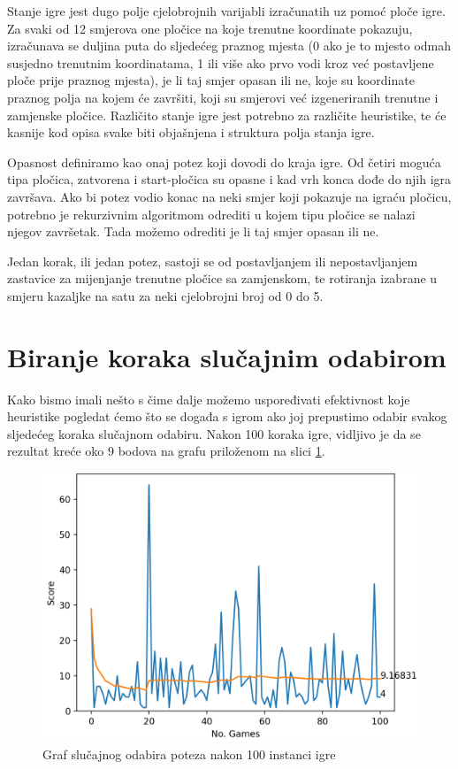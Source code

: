 \documentclass[zavrsnirad]{fer}
\begin{document}
Stanje igre jest dugo polje cjelobrojnih varijabli izračunatih uz pomoć ploče igre. Za svaki od 12 smjerova one pločice na koje trenutne koordinate pokazuju, izračunava se duljina puta do sljedećeg praznog mjesta (0 ako je to mjesto odmah susjedno trenutnim koordinatama, 1 ili više ako prvo vodi kroz već postavljene ploče prije praznog mjesta), je li taj smjer opasan ili ne, koje su koordinate praznog polja na kojem će završiti, koji su smjerovi već izgeneriranih trenutne i zamjenske pločice. Različito stanje igre jest potrebno za različite heuristike, te će kasnije kod opisa svake biti objašnjena i struktura polja stanja igre.

Opasnost definiramo kao onaj potez koji dovodi do kraja igre. Od četiri moguća tipa pločica, zatvorena i start-pločica su opasne i kad vrh konca dođe do njih igra završava. Ako bi potez vodio konac na neki smjer koji pokazuje na igraću pločicu, potrebno je rekurzivnim algoritmom odrediti u kojem tipu pločice se nalazi njegov završetak. Tada možemo odrediti je li taj smjer opasan ili ne.

Jedan korak, ili jedan potez, sastoji se od postavljanjem ili nepostavljanjem zastavice za mijenjanje trenutne pločice sa zamjenskom, te rotiranja izabrane u smjeru kazaljke na satu za neki cjelobrojni broj od 0 do 5.


\section{Biranje koraka slučajnim odabirom}
\label{pog:slucajan_odabir}

Kako bismo imali nešto s čime dalje možemo uspoređivati efektivnost koje heuristike pogledat ćemo što se događa s igrom ako joj prepustimo odabir svakog sljedećeg koraka slučajnom odabiru. Nakon 100 koraka igre, vidljivo je da se rezultat kreće oko 9 bodova na grafu priloženom na slici \ref{slk:random_graph}.


\begin{figure}[htb]
	\centering
	\includegraphics[width=0.68\linewidth]{Figures/random.png} 
	\caption{Graf slučajnog odabira poteza nakon 100 instanci igre}
	\label{slk:random_graph}
\end{figure}
\end{document}
